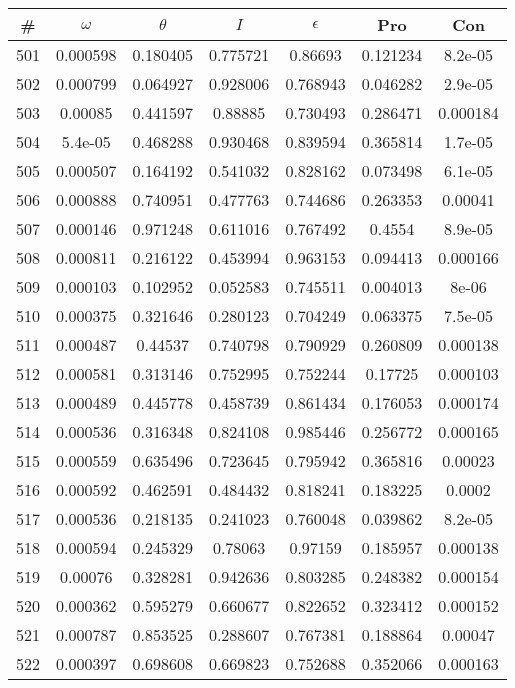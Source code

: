 \newpage
\begin{table}
\begin{tabular}{c|c|c|c|c|c|c}
\# & $\omega$ & $\theta$ & $I$ & $\epsilon$ & Pro & Con\\
\hline
501 & 0.000598 & 0.180405 & 0.775721 & 0.86693 & 0.121234 & 8.2e-05\\
502 & 0.000799 & 0.064927 & 0.928006 & 0.768943 & 0.046282 & 2.9e-05\\
503 & 0.00085 & 0.441597 & 0.88885 & 0.730493 & 0.286471 & 0.000184\\
504 & 5.4e-05 & 0.468288 & 0.930468 & 0.839594 & 0.365814 & 1.7e-05\\
505 & 0.000507 & 0.164192 & 0.541032 & 0.828162 & 0.073498 & 6.1e-05\\
506 & 0.000888 & 0.740951 & 0.477763 & 0.744686 & 0.263353 & 0.00041\\
507 & 0.000146 & 0.971248 & 0.611016 & 0.767492 & 0.4554 & 8.9e-05\\
508 & 0.000811 & 0.216122 & 0.453994 & 0.963153 & 0.094413 & 0.000166\\
509 & 0.000103 & 0.102952 & 0.052583 & 0.745511 & 0.004013 & 8e-06\\
510 & 0.000375 & 0.321646 & 0.280123 & 0.704249 & 0.063375 & 7.5e-05\\
511 & 0.000487 & 0.44537 & 0.740798 & 0.790929 & 0.260809 & 0.000138\\
512 & 0.000581 & 0.313146 & 0.752995 & 0.752244 & 0.17725 & 0.000103\\
513 & 0.000489 & 0.445778 & 0.458739 & 0.861434 & 0.176053 & 0.000174\\
514 & 0.000536 & 0.316348 & 0.824108 & 0.985446 & 0.256772 & 0.000165\\
515 & 0.000559 & 0.635496 & 0.723645 & 0.795942 & 0.365816 & 0.00023\\
516 & 0.000592 & 0.462591 & 0.484432 & 0.818241 & 0.183225 & 0.0002\\
517 & 0.000536 & 0.218135 & 0.241023 & 0.760048 & 0.039862 & 8.2e-05\\
518 & 0.000594 & 0.245329 & 0.78063 & 0.97159 & 0.185957 & 0.000138\\
519 & 0.00076 & 0.328281 & 0.942636 & 0.803285 & 0.248382 & 0.000154\\
520 & 0.000362 & 0.595279 & 0.660677 & 0.822652 & 0.323412 & 0.000152\\
521 & 0.000787 & 0.853525 & 0.288607 & 0.767381 & 0.188864 & 0.00047\\
522 & 0.000397 & 0.698608 & 0.669823 & 0.752688 & 0.352066 & 0.000163\\

\end{tabular}
\end{table}
